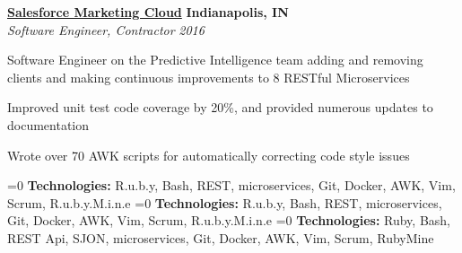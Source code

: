%
    \headerrow
        {\textbf{\href{https://www.marketingcloud.com/}{Salesforce Marketing Cloud}}}
        {\textbf{Indianapolis, IN}}
    \\
    \headerrow
        {\emph{Software Engineer, Contractor}}
        {\emph{2016}}
    \begin{itemize*}
        \item Software Engineer on the Predictive Intelligence team adding and removing clients
            and making continuous improvements to 8 RESTful Microservices
        \item Improved unit test code coverage by 20\%, and provided numerous updates to documentation
        \item Wrote over 70 AWK scripts for automatically correcting code style issues
    \end{itemize*}

    \ifnum{}=0
        \hspace{1.0em}
        {\textbf{Technologies:} R.u.b.y, Bash, REST, microservices, Git, Docker, AWK, Vim, Scrum, R.u.b.y.M.i.n.e}
    \fi
    \ifnum{}=0
        \hspace{1.0em}
        {\textbf{Technologies:} R.u.b.y, Bash, REST, microservices, Git, Docker, AWK, Vim, Scrum, R.u.b.y.M.i.n.e}
    \fi
    \ifnum{}=0
        \hspace{1.0em}
        {\textbf{Technologies:} Ruby, Bash, REST Api, SJON, microservices, Git, Docker, AWK, Vim, Scrum, RubyMine}
    \fi
